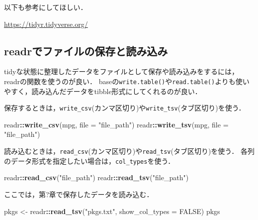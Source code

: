 \documentclass[
]{article}
\newenvironment{Shaded}{\begin{snugshade}}{\end{snugshade}}
\newcommand{\AttributeTok}[1]{\textcolor[rgb]{0.13,0.29,0.53}{#1}}
\newcommand{\ConstantTok}[1]{\textcolor[rgb]{0.56,0.35,0.01}{#1}}
\newcommand{\FunctionTok}[1]{\textcolor[rgb]{0.13,0.29,0.53}{\textbf{#1}}}
\newcommand{\NormalTok}[1]{#1}
\newcommand{\OtherTok}[1]{\textcolor[rgb]{0.56,0.35,0.01}{#1}}
\newcommand{\SpecialCharTok}[1]{\textcolor[rgb]{0.81,0.36,0.00}{\textbf{#1}}}
\newcommand{\StringTok}[1]{\textcolor[rgb]{0.31,0.60,0.02}{#1}}
\begin{document}
以下も参考にしてほしい．

\url{https://tidyr.tidyverse.org/}

\hypertarget{readrux3067ux30d5ux30a1ux30a4ux30ebux306eux4fddux5b58ux3068ux8aadux307fux8fbcux307f}{%
\subsection{readrでファイルの保存と読み込み}\label{readrux3067ux30d5ux30a1ux30a4ux30ebux306eux4fddux5b58ux3068ux8aadux307fux8fbcux307f}}

tidyな状態に整理したデータをファイルとして保存や読み込みをするには，readrの関数を使うのが良い．
baseの\texttt{write.table()}や\texttt{read.table()}よりも使いやすく，読み込んだデータをtibble形式にしてくれるのが良い．

保存するときは，\texttt{write\_csv}(カンマ区切り)や\texttt{write\_tsv}(タブ区切り)を使う．

\begin{Shaded}
\begin{Highlighting}[]
\NormalTok{readr}\SpecialCharTok{::}\FunctionTok{write\_csv}\NormalTok{(mpg, }\AttributeTok{file =} \StringTok{"file\_path"}\NormalTok{)}
\NormalTok{readr}\SpecialCharTok{::}\FunctionTok{write\_tsv}\NormalTok{(mpg, }\AttributeTok{file =} \StringTok{"file\_path"}\NormalTok{)}
\end{Highlighting}
\end{Shaded}

読み込むときは，\texttt{read\_csv}(カンマ区切り)や\texttt{read\_tsv}(タブ区切り)を使う．
各列のデータ形式を指定したい場合は，\texttt{col\_types}を使う．

\begin{Shaded}
\begin{Highlighting}[]
\NormalTok{readr}\SpecialCharTok{::}\FunctionTok{read\_csv}\NormalTok{(}\StringTok{"file\_path"}\NormalTok{)}
\NormalTok{readr}\SpecialCharTok{::}\FunctionTok{read\_tsv}\NormalTok{(}\StringTok{"file\_path"}\NormalTok{)}
\end{Highlighting}
\end{Shaded}

ここでは，第?章で保存したデータを読み込む．

\begin{Shaded}
\begin{Highlighting}[]
\NormalTok{pkgs }\OtherTok{\textless{}{-}}\NormalTok{ readr}\SpecialCharTok{::}\FunctionTok{read\_tsv}\NormalTok{(}\StringTok{"pkgs.txt"}\NormalTok{, }\AttributeTok{show\_col\_types =} \ConstantTok{FALSE}\NormalTok{)}
\NormalTok{pkgs}
\end{Highlighting}
\end{Shaded}
\end{document}

